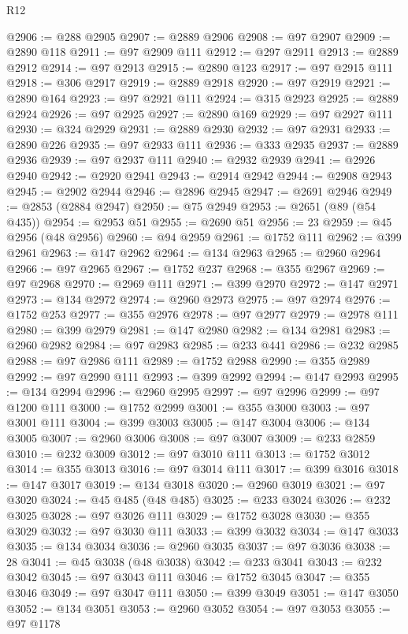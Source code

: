 \begin{lexlean}{R12}
\begin{coremodule}
@2906 := @288 @2905
@2907 := @2889 @2906
@2908 := @97 @2907
@2909 := @2890 @118
@2911 := @97 @2909 @111
@2912 := @297 @2911
@2913 := @2889 @2912
@2914 := @97 @2913
@2915 := @2890 @123
@2917 := @97 @2915 @111
@2918 := @306 @2917
@2919 := @2889 @2918
@2920 := @97 @2919
@2921 := @2890 @164
@2923 := @97 @2921 @111
@2924 := @315 @2923
@2925 := @2889 @2924
@2926 := @97 @2925
@2927 := @2890 @169
@2929 := @97 @2927 @111
@2930 := @324 @2929
@2931 := @2889 @2930
@2932 := @97 @2931
@2933 := @2890 @226
@2935 := @97 @2933 @111
@2936 := @333 @2935
@2937 := @2889 @2936
@2939 := @97 @2937 @111
@2940 := @2932 @2939
@2941 := @2926 @2940
@2942 := @2920 @2941
@2943 := @2914 @2942
@2944 := @2908 @2943
@2945 := @2902 @2944
@2946 := @2896 @2945
@2947 := @2691 @2946
@2949 := @2853 (@2884 @2947)
@2950 := @75 @2949
@2953 := @2651 (@89 (@54 @435))
@2954 := @2953 @51
@2955 := @2690 @51
@2956 := 23
@2959 := @45 @2956 (@48 @2956)
@2960 := @94 @2959
@2961 := @1752 @111
@2962 := @399 @2961
@2963 := @147 @2962
@2964 := @134 @2963
@2965 := @2960 @2964
@2966 := @97 @2965
@2967 := @1752 @237
@2968 := @355 @2967
@2969 := @97 @2968
@2970 := @2969 @111
@2971 := @399 @2970
@2972 := @147 @2971
@2973 := @134 @2972
@2974 := @2960 @2973
@2975 := @97 @2974
@2976 := @1752 @253
@2977 := @355 @2976
@2978 := @97 @2977
@2979 := @2978 @111
@2980 := @399 @2979
@2981 := @147 @2980
@2982 := @134 @2981
@2983 := @2960 @2982
@2984 := @97 @2983
@2985 := @233 @441
@2986 := @232 @2985
@2988 := @97 @2986 @111
@2989 := @1752 @2988
@2990 := @355 @2989
@2992 := @97 @2990 @111
@2993 := @399 @2992
@2994 := @147 @2993
@2995 := @134 @2994
@2996 := @2960 @2995
@2997 := @97 @2996
@2999 := @97 @1200 @111
@3000 := @1752 @2999
@3001 := @355 @3000
@3003 := @97 @3001 @111
@3004 := @399 @3003
@3005 := @147 @3004
@3006 := @134 @3005
@3007 := @2960 @3006
@3008 := @97 @3007
@3009 := @233 @2859
@3010 := @232 @3009
@3012 := @97 @3010 @111
@3013 := @1752 @3012
@3014 := @355 @3013
@3016 := @97 @3014 @111
@3017 := @399 @3016
@3018 := @147 @3017
@3019 := @134 @3018
@3020 := @2960 @3019
@3021 := @97 @3020
@3024 := @45 @485 (@48 @485)
@3025 := @233 @3024
@3026 := @232 @3025
@3028 := @97 @3026 @111
@3029 := @1752 @3028
@3030 := @355 @3029
@3032 := @97 @3030 @111
@3033 := @399 @3032
@3034 := @147 @3033
@3035 := @134 @3034
@3036 := @2960 @3035
@3037 := @97 @3036
@3038 := 28
@3041 := @45 @3038 (@48 @3038)
@3042 := @233 @3041
@3043 := @232 @3042
@3045 := @97 @3043 @111
@3046 := @1752 @3045
@3047 := @355 @3046
@3049 := @97 @3047 @111
@3050 := @399 @3049
@3051 := @147 @3050
@3052 := @134 @3051
@3053 := @2960 @3052
@3054 := @97 @3053
@3055 := @97 @1178

\end{coremodule}
\end{lexlean}
